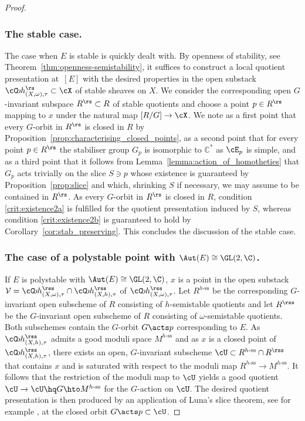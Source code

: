 \begin{proof}
\subsubsection{The stable case.}
The case when $E$ is stable is quickly dealt with. By openness of stability, see Theorem~\ref{thm:openness-semistability}, it suffices to construct a local quotient presentation at~$[E]$ with the desired properties in the open substack $\cC\!oh_{(X,\omega),\tau}^{\rs} \subset \cX$ of stable sheaves on $X$. We consider the corresponding open $G$-invariant subspace $R^{\rs} \subset R$ of stable quotients and choose a point $p \in R^{\rs}$ mapping to $x$ under the natural map $[R/G] \to \cX$. We note as a first point that every $G$-orbit in $R^{\rs}$ is closed in $R$ by Proposition~\ref{prop:characterising_closed_points}, as a second point that for every point $p \in R^{\rs}$ the stabiliser group $G_p$ is isomorphic to $\mathbb{C}^*$ as $\cE_p$ is simple, and as a third point that it follows from Lemma~\ref{lemma:action_of_homotheties} that $G_p$ acts trivially on the slice $S \ni p$ whose existence is guaranteed by Proposition~\ref{prop:slice} and which, shrinking $S$ if necessary, we may assume to be contained in $R^{\rs}$. As every $G$-orbit in $R^{\rs}$ is closed in $R$, condition \eqref{crit:existence2a} is fulfilled for the quotient presentation induced by $S$, whereas condition \eqref{crit:existence2b} is guaranteed to hold by Corollary~\ref{cor:stab_preserving}. This concludes the discussion of the stable case.

\vspace*{-3pt}\vskip0pt
\subsubsection{The case of a polystable point with $\Aut(E)\cong\GL(2,\C)$.}
If $E$ is polystable with $\Aut(E)\cong\GL(2,\C)$, $x$ is a point in the open substack $\mathcal{V} = \cC\!oh_{(X,\omega),\tau}^{{\rss}}\cap\cC\!oh_{(X,h),\tau}^{{\rss}}$ of $\cC\!oh_{(X,\omega),\tau}^{{\rss}}$. Let $R^{h\text{-ss}}$ be the corresponding $G$-invariant open subscheme of $R$ consisting of $h$-semistable quotients and let $R^{{\rss}}$ be the $G$-invariant open subscheme of $R$ consisting of $\omega$-semistable quotients. Both subschemes contain the $G$-orbit $G\acts p$ corresponding to $E$. As $\cC\!oh_{(X,h),\tau}^{{\rss}}$ admits a good moduli space $M^{h\text{-ss}}$ and as $x$ is a closed point of $\cC\!oh_{(X,h),\tau}^{{\rss}}$, there exists an open, $G$-invariant subscheme $\cU \subset R^{h\text{-ss}} \cap R^{{\rss}}$ that contains $x$ and is saturated with respect to the moduli map $R^{h\text{-ss}} \to M^{h\text{-ss}}$. It follows that the restriction of the moduli map to $\cU$ yields a good quotient $\cU \to \cU\hq G \hto M^{h\text{-ss}}$ for the $G$-action on $\cU$. The desired quotient presentation is then produced by an application of Luna's slice theorem, see for example \cite{D_Luna},
at the closed orbit $G\acts p \subset \cU$.


\end{proof}
